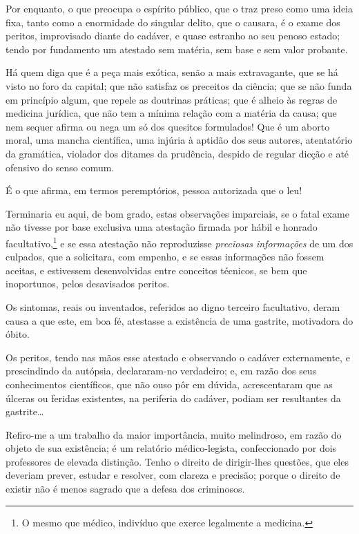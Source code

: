 {Por enquanto, o que preocupa o espírito público, que o traz preso como
uma ideia fixa, tanto como a enormidade do singular delito, que o
causara, é o exame dos peritos, improvisado diante do cadáver, e quase
estranho ao seu penoso estado; tendo por fundamento um atestado sem
matéria, sem base e sem valor probante.

Há quem diga que é a peça mais exótica, senão a mais extravagante, que
se há visto no foro da capital; que não satisfaz os preceitos da
ciência; que se não funda em princípio algum, que repele as doutrinas
práticas; que é alheio às regras de medicina jurídica, que não tem a
mínima relação com a matéria da causa; que nem sequer afirma ou nega um
só dos quesitos formulados! Que é um aborto moral, uma mancha
científica, uma injúria à aptidão dos seus autores, atentatório da
gramática, violador dos ditames da prudência, despido de regular dicção
e até ofensivo do senso comum.

É o que afirma, em termos peremptórios, pessoa autorizada que o leu!

Terminaria eu aqui, de bom grado, estas observações imparciais, se o
fatal exame não tivesse por base exclusiva uma atestação firmada por
hábil e honrado facultativo,\footnote{O mesmo que médico, indivíduo que
  exerce legalmente a medicina.} e se essa atestação não reproduzisse
\emph{preciosas informações} de um dos culpados, que a solicitara, com
empenho, e se essas informações não fossem aceitas, e estivessem
desenvolvidas entre conceitos técnicos, se bem que inoportunos, pelos
desavisados peritos.

Os sintomas, reais ou inventados, referidos ao digno terceiro
facultativo, deram causa a que este, em boa fé, atestasse a existência
de uma gastrite, motivadora do óbito.

Os peritos, tendo nas mãos esse atestado e observando o cadáver
externamente, e prescindindo da autópsia, declararam-no verdadeiro; e,
em razão dos seus conhecimentos científicos, que não ouso pôr em dúvida,
acrescentaram que as úlceras ou feridas existentes, na periferia do
cadáver, podiam ser resultantes da gastrite\ldots{}

Refiro-me a um trabalho da maior importância, muito melindroso, em razão
do objeto de sua existência; é um relatório médico-legista,
confeccionado por dois professores de elevada distinção. Tenho o direito
de dirigir-lhes questões, que eles deveriam prever, estudar e resolver,
com clareza e precisão; porque o direito de existir não é menos sagrado
que a defesa dos criminosos.

}
